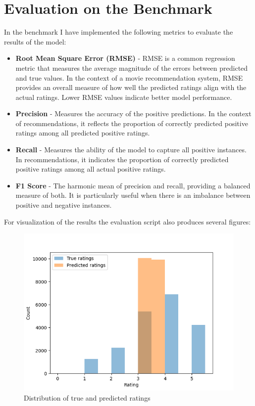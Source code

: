 \documentclass[]{article}
\begin{document}
	\section{Evaluation on the Benchmark}
	In the benchmark I have implemented the following metrics to evaluate the results of the model:
	\begin{itemize}
		\item \textbf{Root Mean Square Error (RMSE)} - RMSE is a common regression metric that measures the average magnitude of the errors between predicted and true values.
		In the context of a movie recommendation system, RMSE provides an overall measure of how well the predicted ratings align with the actual ratings.
		Lower RMSE values indicate better model performance.
		\item \textbf{Precision} - Measures the accuracy of the positive predictions. In the context of recommendations, it reflects the proportion of correctly predicted positive ratings among all predicted positive ratings.
		\item \textbf{Recall} - Measures the ability of the model to capture all positive instances. In recommendations, it indicates the proportion of correctly predicted positive ratings among all actual positive ratings.
		\item \textbf{F1 Score} - The harmonic mean of precision and recall, providing a balanced measure of both. It is particularly useful when there is an imbalance between positive and negative instances.
	\end{itemize}
	
	For visualization of the results the evaluation script also produces several figures:
	
	\begin{figure}[H]
		\includegraphics[scale=1]{figures/fig_1.png}
		\caption{Distribution of true and predicted ratings}
	\end{figure} 
	
\end{document}
